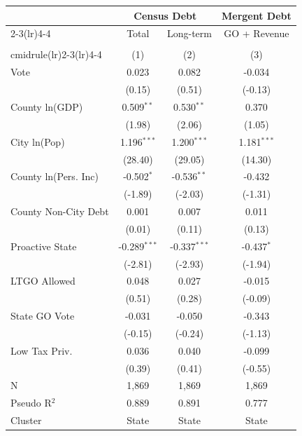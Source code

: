 \begingroup
\centering
\begin{tabular*}{\textwidth}{@{\extracolsep{\fill}}lccc}
   \toprule
                        & \multicolumn{2}{c}{Census Debt} & \multicolumn{1}{c}{Mergent Debt}\\  
   \cmidrule(lr){2-3}\cmidrule(lr){4-4}
 & Total & Long-term & GO + Revenue \\
   \\cmidrule(lr){2-3}\cmidrule(lr){4-4}
                        & (1)               & (2)                   & (3)\\  
   \midrule 
   Vote                 & 0.023             & 0.082                 & -0.034\\   
                        & (0.15)           & (0.51)               & (-0.13)\\   
   County ln(GDP)       & 0.509$^{**}$      & 0.530$^{**}$          & 0.370\\   
                        & (1.98)           & (2.06)               & (1.05)\\   
   City ln(Pop)         & 1.196$^{***}$     & 1.200$^{***}$         & 1.181$^{***}$\\   
                        & (28.40)          & (29.05)              & (14.30)\\   
   County ln(Pers. Inc) & -0.502$^{*}$      & -0.536$^{**}$         & -0.432\\   
                        & (-1.89)          & (-2.03)              & (-1.31)\\   
   County Non-City Debt & 0.001             & 0.007                 & 0.011\\   
                        & (0.01)           & (0.11)               & (0.13)\\   
   Proactive State      & -0.289$^{***}$    & -0.337$^{***}$        & -0.437$^{*}$\\   
                        & (-2.81)          & (-2.93)              & (-1.94)\\   
   LTGO Allowed         & 0.048             & 0.027                 & -0.015\\   
                        & (0.51)           & (0.28)               & (-0.09)\\   
   State GO Vote        & -0.031            & -0.050                & -0.343\\   
                        & (-0.15)          & (-0.24)              & (-1.13)\\   
   Low Tax Priv.        & 0.036             & 0.040                 & -0.099\\   
                        & (0.39)           & (0.41)               & (-0.55)\\   
   \hline
   N         & 1,869             & 1,869                 & 1,869\\  
   Pseudo R$^2$         & 0.889             & 0.891                 & 0.777\\  
   Cluster              & State & State & State\\  
   \bottomrule
\end{tabular*}
\par\endgroup
